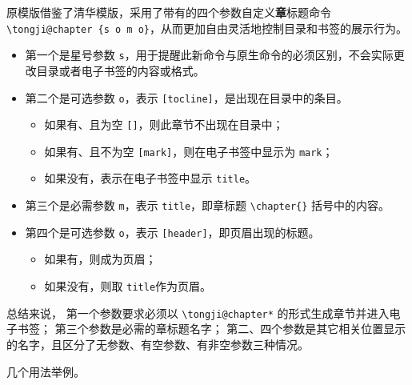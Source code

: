 \documentclass[../Main/thesis.tex]{subfiles}
\begin{document}
原模版借鉴了清华模版，采用了带有的四个参数自定义\textbf{章}标题命令 \texttt{\textbackslash{}tongji@chapter \{s\ o\ m\ o\}}，从而更加自由灵活地控制目录和书签的展示行为。

\begin{itemize}
\item 第一个是星号参数 \texttt{s}，用于提醒此新命令与原生命令的必须区别，不会实际更改目录或者电子书签的内容或格式。
\item 第二个是可选参数 \texttt{o}，表示 \texttt{[tocline]}，是出现在目录中的条目。
\begin{itemize}
  \item 如果有、且为空 \texttt{[]}，则此章节不出现在目录中；
  \item 如果有、且不为空 \texttt{[mark]}，则在电子书签中显示为 \texttt{mark}；
  \item 如果没有，表示在电子书签中显示 \texttt{title}。
  \end{itemize}
\item 第三个是必需参数 \texttt{m}，表示 \texttt{title}，即章标题 \texttt{\textbackslash{}chapter\{\}} 括号中的内容。
\item 第四个是可选参数 \texttt{o}，表示 \texttt{[header]}，即页眉出现的标题。
\begin{itemize}
  \item 如果有，则成为页眉；
  \item 如果没有，则取 \texttt{title}作为页眉。
\end{itemize}
\end{itemize}

总结来说， 第一个参数要求必须以 \texttt{\textbackslash{}tongji@chapter*}
的形式生成章节并进入电子书签； 第三个参数是必需的章标题名字；
第二、四个参数是其它相关位置显示的名字，且区分了无参数、有空参数、有非空参数三种情况。

几个用法举例。
\end{document}
